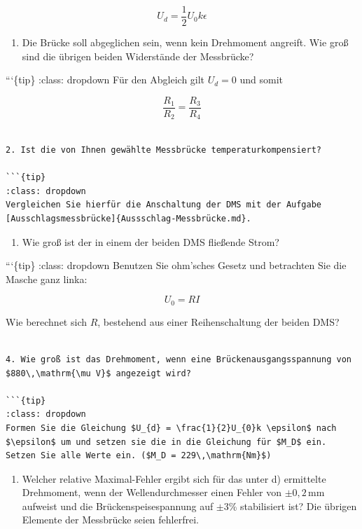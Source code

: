 \documentclass[
]{book}
\providecommand{\tightlist}{%
  \setlength{\itemsep}{0pt}\setlength{\parskip}{0pt}}
\begin{document}
\[U_{d} = \frac{1}{2}U_{0}k \epsilon\]

\begin{enumerate}
\def\labelenumi{\arabic{enumi}.}
\tightlist
\item
  Die Brücke soll abgeglichen sein, wenn kein Drehmoment angreift. Wie groß sind die übrigen beiden Widerstände der Messbrücke?
\end{enumerate}

```\{tip\} :class: dropdown Für den Abgleich gilt \(U_d = 0\) und somit

\[\frac{R_1}{R_2} = \frac{R_3}{R_4}\]

\begin{verbatim}

2. Ist die von Ihnen gewählte Messbrücke temperaturkompensiert?

```{tip}
:class: dropdown
Vergleichen Sie hierfür die Anschaltung der DMS mit der Aufgabe [Ausschlagsmessbrücke]{Aussschlag-Messbrücke.md}.
\end{verbatim}

\begin{enumerate}
\def\labelenumi{\arabic{enumi}.}
\setcounter{enumi}{2}
\tightlist
\item
  Wie groß ist der in einem der beiden DMS fließende Strom?
\end{enumerate}

```\{tip\} :class: dropdown Benutzen Sie ohm'sches Gesetz und betrachten Sie die Masche ganz linka:

\[U_ 0 = RI\]

Wie berechnet sich \(R\), bestehend aus einer Reihenschaltung der beiden DMS?

\begin{verbatim}

4. Wie groß ist das Drehmoment, wenn eine Brückenausgangsspannung von $880\,\mathrm{\mu V}$ angezeigt wird?

```{tip}
:class: dropdown
Formen Sie die Gleichung $U_{d} = \frac{1}{2}U_{0}k \epsilon$ nach $\epsilon$ um und setzen sie die in die Gleichung für $M_D$ ein. Setzen Sie alle Werte ein. ($M_D = 229\,\mathrm{Nm}$)
\end{verbatim}

\begin{enumerate}
\def\labelenumi{\arabic{enumi}.}
\setcounter{enumi}{4}
\tightlist
\item
  Welcher relative Maximal-Fehler ergibt sich für das unter d) ermittelte Drehmoment, wenn der Wellendurchmesser einen Fehler von \(\pm 0,2\,\mathrm{mm}\) aufweist und die Brückenspeisespannung auf \(\pm 3\)\% stabilisiert ist? Die übrigen Elemente der Messbrücke seien fehlerfrei.
\end{enumerate}
\end{document}
